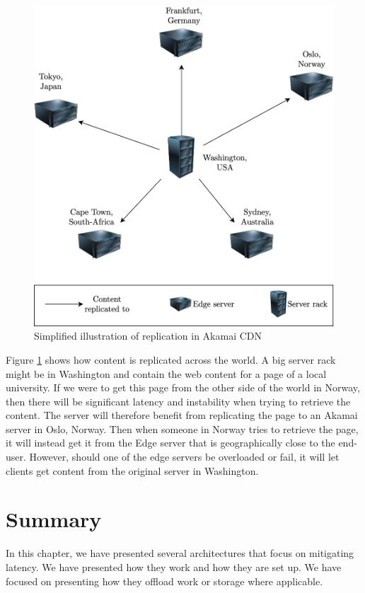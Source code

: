 \begin{figure}[t]
    \centering
    \includegraphics[scale=0.8]{chapters/4_architectures/figures/akamai_dist.png}
    \caption{Simplified illustration of replication in Akamai CDN}
    \label{fig:Akamai_cdn}
\end{figure}

Figure \ref{fig:Akamai_cdn} shows how content is replicated across the world. A big server rack might be in Washington and contain the web content for a page of a local university. If we were to get this page from the other side of the world in Norway, then there will be significant latency and instability when trying to retrieve the content. The server will therefore benefit from replicating the page to an Akamai server in Oslo, Norway. Then when someone in Norway tries to retrieve the page, it will instead get it from the Edge server that is geographically close to the end-user. However, should one of the edge servers be overloaded or fail, it will let clients get content from the original server in Washington. 




\section{Summary}
In this chapter, we have presented several architectures that focus on mitigating latency. We have presented how they work and how they are set up. We have focused on presenting how they offload work or storage where applicable. 
